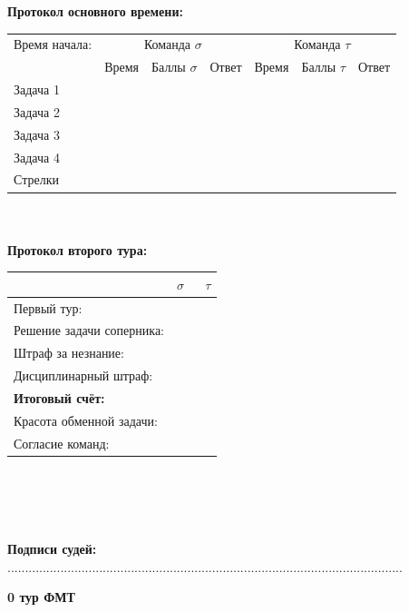 \documentclass[12pt]{article}
\begin{document}
\begin{center}{\bf Протокол основного времени: } \\ 
\begin{tabular}{|p{3.3cm}|p{1.5cm}|p{2cm}|p{1.5cm}|p{1.5cm}|p{2cm}|p{1.5cm}|}
\hline Время начала: & \multicolumn{3}{c|}{Команда $\sigma$} & \multicolumn{3}{c|}{Команда $\tau$ }\\\cline{2-7} {} & Время & Баллы $\sigma$ & Ответ & Время & Баллы $\tau$ & Ответ \\\hline \hline \center Задача 1 &{}&{}&{}&{}&{}&{}\\[20mm]\hline \hline \center Задача 2 &{}&{}&{}&{}&{}&{}\\[20mm]\hline \hline \center Задача 3 &{}&{}&{}&{}&{}&{}\\[20mm]\hline \hline \center Задача 4 &{}&{}&{}&{}&{}&{}\\[20mm]\hline \hline \center Стрелки &{}&{}&{}&{}&{}&{}\\[20mm]\hline
\end{tabular}
$ $\\
$ $\\
{\bf Протокол второго тура: } \\ 
\begin{tabular}{ | p{7cm} | p{1cm} | p{1cm} |}
\hline
$ $ & \centering $\sigma$ & $\;$ $\tau$ \\ \hline\raggedleft Первый тур: & & \\ \hline\raggedleft Решение задачи соперника: & & \\ \hline\raggedleft Штраф за незнание: & & \\ \hline\raggedleft Дисциплинарный штраф: & & \\ \hline\raggedleft \bf Итоговый счёт: & & \\ \hline \hline\raggedleft Красота обменной задачи: & & \\ \hline\raggedleft Согласие команд: & & \\ \hline\end{tabular}\end{center}
$ $\\
$ $\\
$ $\\
$ $\\
{\bf Подписи судей: }................................................................................................................\newpage
\begin{center}
{\Huge \bf 0 тур ФМТ}
\end{center}
\end{document}
